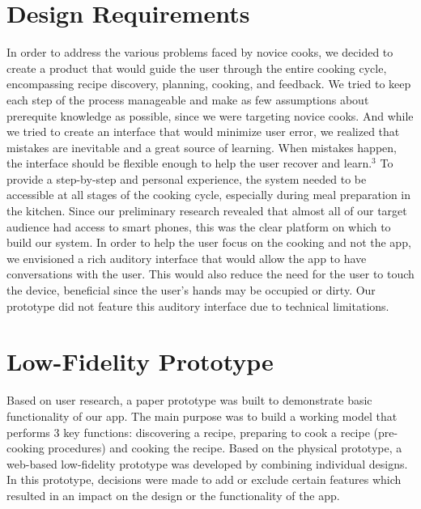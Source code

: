 \documentclass{sigchi}
\begin{document}
\section{Design Requirements}
In order to address the various problems faced by novice cooks, we decided to create a product that would guide the user through the entire cooking cycle, encompassing recipe discovery, planning, cooking, and feedback. We tried to keep each step of the process manageable and make as few assumptions about prerequite knowledge as possible, since we were targeting novice cooks. And while we tried to create an interface that would minimize user error, we realized that mistakes are inevitable and a great source of learning. When mistakes happen, the interface should be flexible enough to help the user recover and learn.$^{3}$
To provide a step-by-step and personal experience, the system needed to be accessible at all stages of the cooking cycle, especially during meal preparation in the kitchen. Since our preliminary research revealed that almost all of our target audience had access to smart phones, this was the clear platform on which to build our system. \newline \newline
In order to help the user focus on the cooking and not the app, we envisioned a rich auditory interface that would allow the app to have conversations with the user. This would also reduce the need for the user to touch the device, beneficial since the user’s hands may be occupied or dirty. Our prototype did not feature this auditory interface due to technical limitations.


\section{Low-Fidelity Prototype}
Based on user research, a paper prototype was built to demonstrate basic functionality of our app. The main purpose was to build a working model that performs 3 key functions: discovering a recipe, preparing to cook a recipe (pre-cooking procedures) and cooking the recipe. Based on the physical prototype, a web-based low-fidelity prototype was developed by combining individual designs. In this prototype, decisions were made to add or exclude certain features which resulted in an impact on the design or the functionality of the app. \newline
\end{document}
